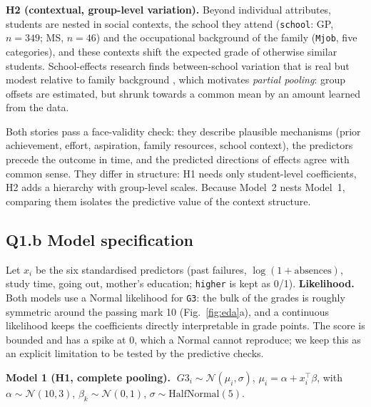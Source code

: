 \documentclass[10pt,a4paper]{article}
\newcommand{\code}[1]{\texttt{#1}}
\begin{document}
\textbf{H2 (contextual, group-level variation).} Beyond individual attributes, students are nested in social contexts, the school they attend (\code{school}: GP, $n{=}349$; MS, $n{=}46$) and the occupational background of the family (\code{Mjob}, five categories), and these contexts shift the expected grade of otherwise similar students. School-effects research finds between-school variation that is real but modest relative to family background \cite{coleman1966,raudenbush2002}, which motivates \emph{partial pooling}: group offsets are estimated, but shrunk towards a common mean by an amount learned from the data.

Both stories pass a face-validity check: they describe plausible mechanisms (prior achievement, effort, aspiration, family resources, school context), the predictors precede the outcome in time, and the predicted directions of effects agree with common sense. They differ in structure: H1 needs only student-level coefficients, H2 adds a hierarchy with group-level scales. Because Model~2 nests Model~1, comparing them isolates the predictive value of the context structure.

\subsection{Q1.b Model specification}
Let $x_i$ be the six standardised predictors (past failures, $\log(1+\text{absences})$, study time, going out, mother's education; \code{higher} is kept as 0/1). \textbf{Likelihood.} Both models use a Normal likelihood for \code{G3}: the bulk of the grades is roughly symmetric around the passing mark 10 (Fig.~\ref{fig:eda}a), and a continuous likelihood keeps the coefficients directly interpretable in grade points. The score is bounded and has a spike at 0, which a Normal cannot reproduce; we keep this as an explicit limitation to be tested by the predictive checks.

\textbf{Model 1 (H1, complete pooling).} $\;G3_i \sim \mathcal N(\mu_i,\sigma)$, $\mu_i=\alpha+x_i^{\top}\beta$, with $\alpha\sim\mathcal N(10,3)$, $\beta_k\sim\mathcal N(0,1)$, $\sigma\sim\text{HalfNormal}(5)$.
\end{document}
